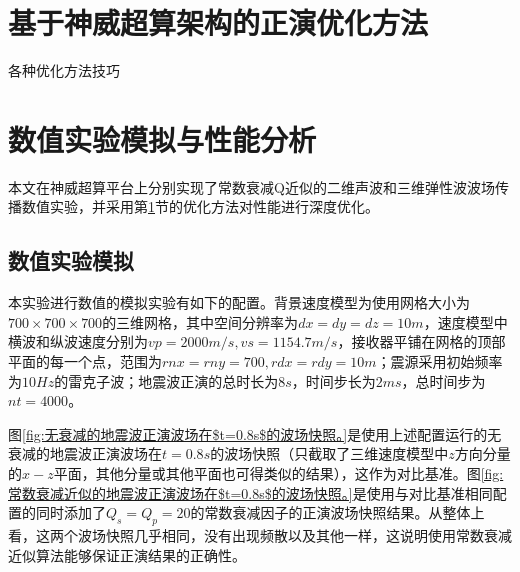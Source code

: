 \documentclass[degree=doctor]{thuthesis}
\begin{document}
\section{基于神威超算架构的正演优化方法}
\label{sec:基于神威超算架构的正演优化方法}
各种优化方法技巧

\section{数值实验模拟与性能分析}

本文在神威超算平台上分别实现了常数衰减Q近似的二维声波和三维弹性波波场传播数值实验，并采用第\ref{sec:基于神威超算架构的正演优化方法}节的优化方法对性能进行深度优化。

\subsection{数值实验模拟}
本实验进行数值的模拟实验有如下的配置。背景速度模型为使用网格大小为$700\times700\times700$的三维网格，其中空间分辨率为$dx=dy=dz=10m$，速度模型中横波和纵波速度分别为$vp=2000m/s, vs=1154.7m/s$，接收器平铺在网格的顶部平面的每一个点，范围为$rnx=rny=700, rdx=rdy=10m$；震源采用初始频率为$10Hz$的雷克子波；地震波正演的总时长为$8s$，时间步长为$2ms$，总时间步为$nt=4000$。

图\ref{fig:无衰减的地震波正演波场在$t=0.8s$的波场快照。}是使用上述配置运行的无衰减的地震波正演波场在$t=0.8s$的波场快照（只截取了三维速度模型中$z$方向分量的$x-z$平面，其他分量或其他平面也可得类似的结果），这作为对比基准。图\ref{fig:常数衰减近似的地震波正演波场在$t=0.8s$的波场快照。}是使用与对比基准相同配置的同时添加了$Q_s=Q_p=20$的常数衰减因子的正演波场快照结果。从整体上看，这两个波场快照几乎相同，没有出现频散以及其他一样，这说明使用常数衰减近似算法能够保证正演结果的正确性。
\end{document}

